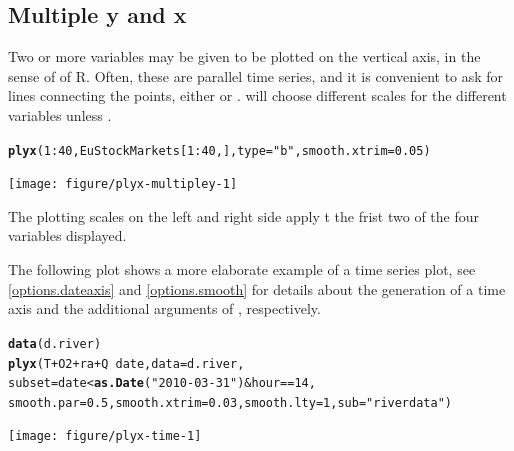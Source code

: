 \documentclass[11pt]{article}\usepackage[]{graphicx}\usepackage[]{color}
\makeatletter
\newcommand{\hlnum}[1]{\textcolor[rgb]{0.686,0.059,0.569}{#1}}%
\newcommand{\hlstr}[1]{\textcolor[rgb]{0.192,0.494,0.8}{#1}}%
\newcommand{\hlopt}[1]{\textcolor[rgb]{0,0,0}{#1}}%
\newcommand{\hlstd}[1]{\textcolor[rgb]{0.345,0.345,0.345}{#1}}%
\newcommand{\hlkwc}[1]{\textcolor[rgb]{0.333,0.667,0.333}{#1}}%
\newcommand{\hlkwd}[1]{\textcolor[rgb]{0.737,0.353,0.396}{\textbf{#1}}}%
\newenvironment{kframe}{%
 \def\at@end@of@kframe{}%
 \ifinner\ifhmode%
  \def\at@end@of@kframe{\end{minipage}}%
  \begin{minipage}{\columnwidth}%
 \fi\fi%
 \def\FrameCommand##1{\hskip\@totalleftmargin \hskip-\fboxsep
 \colorbox{shadecolor}{##1}\hskip-\fboxsep
     \hskip-\linewidth \hskip-\@totalleftmargin \hskip\columnwidth}%
 \MakeFramed {\advance\hsize-\width
   \@totalleftmargin\z@ \linewidth\hsize
   \@setminipage}}%
 {\par\unskip\endMakeFramed%
 \at@end@of@kframe}
\newenvironment{knitrout}{}{} %
\makeatother
\begin{document}
\subsection{Multiple y and x}
\label{sec:multipleyx}
Two or more variables may be given to be plotted on the vertical axis,
in the sense of  of R.
Often, these are parallel time series, and it is convenient to ask for 
lines connecting the points, either  or .
 will choose different scales for the different variables unless
.

\begin{knitrout}
\color{fgcolor}\begin{kframe}
\begin{alltt}
\hlkwd{plyx}\hlstd{(}\hlnum{1}\hlopt{:}\hlnum{40}\hlstd{, EuStockMarkets[}\hlnum{1}\hlopt{:}\hlnum{40}\hlstd{,],} \hlkwc{type}\hlstd{=}\hlstr{"b"}\hlstd{,} \hlkwc{smooth.xtrim}\hlstd{=}\hlnum{0.05}\hlstd{)}
\end{alltt}
\end{kframe}
\texttt{[image: figure/plyx-multipley-1]} 
\end{knitrout}

The plotting scales on the left and right side apply t the frist two of 
the four variables displayed.

The following plot shows a more elaborate example of a time series plot,
see \ref{options.dateaxis} and \ref{options.smooth}
for details about the generation of a time axis and
the additional arguments of , respectively.

\begin{knitrout}
\color{fgcolor}\begin{kframe}
\begin{alltt}
  \hlkwd{data}\hlstd{(d.river)}
  \hlkwd{plyx}\hlstd{(T}\hlopt{+}\hlstd{O2}\hlopt{+}\hlstd{ra}\hlopt{+}\hlstd{Q}\hlopt{~}\hlstd{date,} \hlkwc{data}\hlstd{=d.river,}
       \hlkwc{subset}\hlstd{=date}\hlopt{<}\hlkwd{as.Date}\hlstd{(}\hlstr{"2010-03-31"}\hlstd{)}\hlopt{&}\hlstd{hour}\hlopt{==}\hlnum{14}\hlstd{,}
       \hlkwc{smooth.par}\hlstd{=}\hlnum{0.5}\hlstd{,} \hlkwc{smooth.xtrim}\hlstd{=}\hlnum{0.03}\hlstd{,} \hlkwc{smooth.lty}\hlstd{=}\hlnum{1}\hlstd{,} \hlkwc{sub}\hlstd{=}\hlstr{"river data"}\hlstd{)}
\end{alltt}
\end{kframe}
\texttt{[image: figure/plyx-time-1]} 
\end{knitrout}
\end{document}

